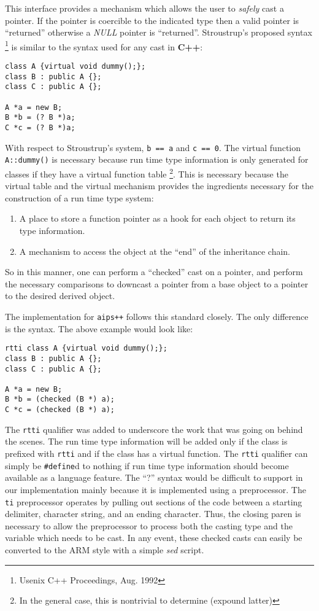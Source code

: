 This interface provides a mechanism which allows the user to {\em safely} cast
a pointer. If the pointer is coercible to the indicated type then a valid
pointer is ``returned'' otherwise a {\em NULL} pointer is ``returned''.
Stroustrup's proposed syntax \footnote{Usenix C++ Proceedings, Aug. 1992} is 
similar to the syntax used for any cast in {\bf C++}:
\begin{verbatim}
class A {virtual void dummy();};
class B : public A {};
class C : public A {};

A *a = new B;
B *b = (? B *)a;
C *c = (? B *)a;
\end{verbatim}
\noindent
With respect to Stroustrup's system, {\tt b == a} and {\tt c == 0}. The
virtual function {\tt A::dummy()} is necessary because run time type 
information is only generated for classes if they have a virtual function 
table \footnote{In the general case, this is nontrivial to determine (expound
latter)}. This is necessary because the virtual table and the virtual 
mechanism provides the ingredients necessary for the construction of a 
run time type system:
\begin{enumerate}
\item
A place to store a function pointer as a hook for each object to return
its type information.
\item
A mechanism to access the object at the ``end'' of the inheritance chain.
\end{enumerate}
\noindent
So in this manner, one can perform a ``checked'' cast on a pointer, and
perform the necessary comparisons to downcast a pointer from a base object
to a pointer to the desired derived object.

The implementation for {\tt aips++} follows this standard closely. The only
difference is the syntax. The above example would look like:
\begin{verbatim}
rtti class A {virtual void dummy();};
class B : public A {};
class C : public A {};

A *a = new B;
B *b = (checked (B *) a);
C *c = (checked (B *) a);
\end{verbatim}
\noindent
The {\tt rtti} qualifier was added to underscore the work that was going on 
behind the scenes. The run time type information will be added only if the
class is prefixed with {\tt rtti} and if the class has a virtual function.
The {\tt rtti} qualifier can simply be {\tt \#define}d to nothing if 
run time type information should become available as a language feature.
The ``?'' syntax would be difficult to support in our implementation mainly
because it is implemented using a preprocessor. The {\tt ti} preprocessor
operates by pulling out sections of the code between a starting delimiter, 
character string, and an ending character. Thus, the closing paren is 
necessary to allow the preprocessor to process both the casting type and the 
variable which needs to be cast. In any event, these checked casts can easily 
be converted to the ARM style with a simple {\em sed} script.

